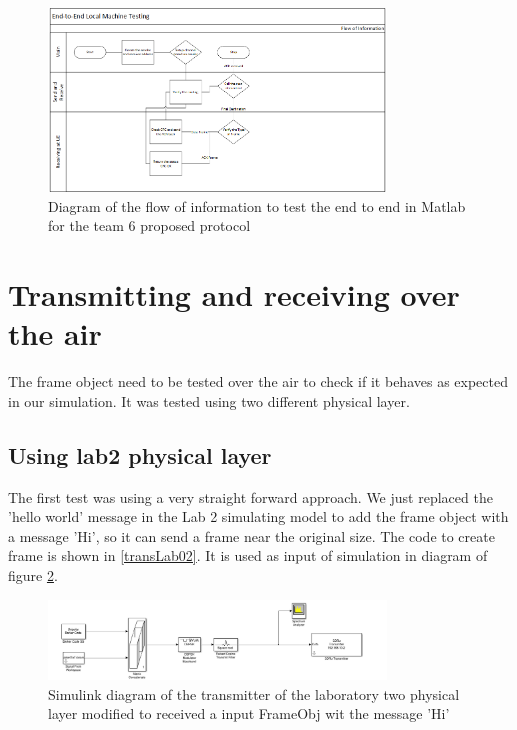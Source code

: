 



\begin{figure}[ht]
    \centering
    \includegraphics[width=0.8\textwidth]{flowEndtoEnd.PNG}
    \caption{Diagram of the flow of information to test the end to end in Matlab for the team 6 proposed protocol}
    \label{fig:endendDiagram}
\end{figure} 

\section{Transmitting and receiving over the air}
The frame object need to be tested over the air to check if it behaves as expected in our simulation. 
It was tested using two different physical layer. 
\subsection{Using lab2 physical layer}

The first test was using a very straight forward approach. We just replaced the 'hello world' message in the Lab 2 
simulating model to add the frame object with a message 'Hi', so it can send a frame near the original size.
The code to create frame is shown in \ref{transLab02}. It is used as input of simulation in diagram of figure \ref{fig:trasmitter_lab02}.


\begin{figure}[ht]
    \centering
    \includegraphics[width=0.8\textwidth]{trasmitter_lab02.PNG}
    \caption{Simulink diagram of the transmitter of the laboratory two physical layer modified to received a input FrameObj wit the message 'Hi' }
    \label{fig:trasmitter_lab02}
\end{figure}

